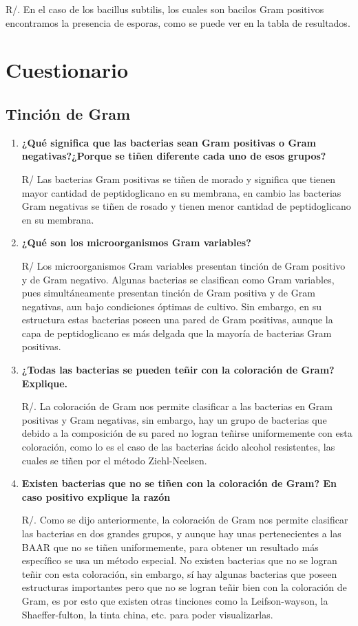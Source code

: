 \documentclass[journal,transmag]{IEEEtran}
\begin{document}
R/. En el caso de los bacillus subtilis, los cuales son bacilos Gram positivos encontramos la presencia de esporas, como se puede ver en la tabla de resultados. 


\section{Cuestionario}
\subsection{\textbf{Tinción de Gram}}
\begin{enumerate}
	\item \textbf{¿Qué significa que las bacterias sean Gram positivas o Gram negativas?¿Porque se tiñen diferente cada uno de esos grupos?}
	
	R/ Las bacterias Gram positivas se tiñen de morado y significa que tienen mayor cantidad de peptidoglicano en su membrana, en cambio las bacterias Gram negativas se tiñen de rosado y tienen menor cantidad de peptidoglicano en su membrana. 
	
	\item \textbf{¿Qué son los microorganismos Gram variables? }
	
	R/ Los microorganismos Gram variables presentan tinción de Gram positivo y de Gram negativo. Algunas bacterias se clasifican como Gram variables, pues simultáneamente presentan tinción de Gram positiva y de Gram negativas, aun bajo condiciones óptimas de cultivo. Sin embargo, en su estructura estas bacterias poseen una pared de Gram positivas, aunque la capa de peptidoglicano es más delgada que la mayoría de bacterias Gram positivas. 
	
	\item \textbf{¿Todas las bacterias se pueden teñir con la coloración de Gram? Explique.}
	
	R/. La coloración de Gram nos permite clasificar a las bacterias en Gram positivas y Gram negativas, sin embargo, hay un grupo de bacterias que debido a la composición de su pared no logran teñirse uniformemente con esta coloración, como lo es el caso de las bacterias ácido alcohol resistentes, las cuales se tiñen por el método Ziehl-Neelsen. 


\item \textbf{Existen bacterias que no se tiñen con la coloración de Gram? En caso positivo explique la razón}

R/. Como se dijo anteriormente, la coloración de Gram nos permite clasificar las bacterias en dos grandes grupos, y aunque hay unas pertenecientes a las BAAR que no se tiñen uniformemente, para obtener un resultado más específico se usa un método especial. 
No existen bacterias que no se logran teñir con esta coloración, sin embargo, sí hay algunas bacterias que poseen estructuras importantes pero que no se logran teñir bien con la coloración de Gram, es por esto que existen otras tinciones como la Leifson-wayson, la Shaeffer-fulton, la tinta china, etc. para poder visualizarlas. 

\end{enumerate}
\end{document}
